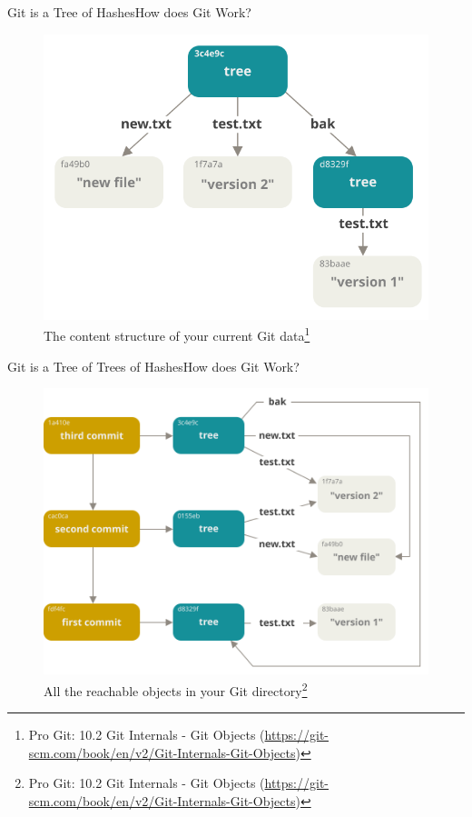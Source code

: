 \documentclass[aspectratio=169]{beamer}
\begin{document}
\begin{frame}{Git is a Tree of Hashes}{How does Git Work?}
\begin{figure}
    \centering
    \includegraphics[width=\textwidth,height=0.6\textheight,keepaspectratio]{data-model-2}
    \caption{
        The content structure of your current Git data\footnote{
            Pro Git: 10.2 Git Internals - Git Objects
            (\url{https://git-scm.com/book/en/v2/Git-Internals-Git-Objects})
        }
    }
\end{figure}
\end{frame}

\begin{frame}{Git is a Tree of Trees of Hashes}{How does Git Work?}
\begin{figure}
    \centering
    \includegraphics[width=\textwidth,height=0.6\textheight,keepaspectratio]{data-model-3}
    \caption{
        All the reachable objects in your Git directory\footnote{
            Pro Git: 10.2 Git Internals - Git Objects
            (\url{https://git-scm.com/book/en/v2/Git-Internals-Git-Objects})
        }
    }
\end{figure}
\end{frame}
\end{document}
